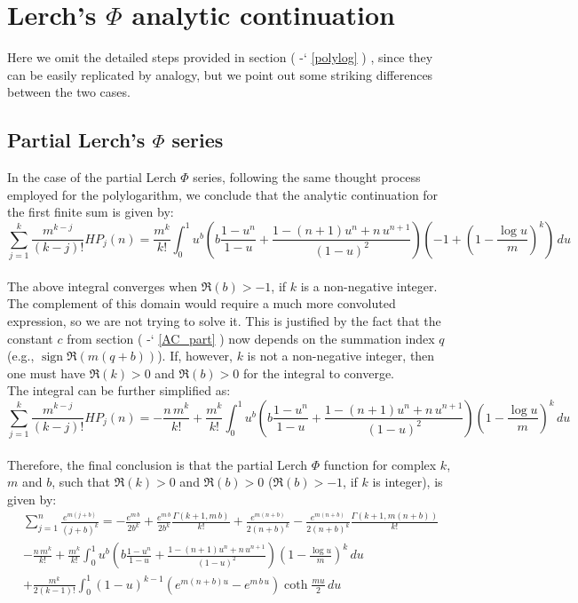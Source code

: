 \documentclass[12pt]{article}
\DeclareMathOperator{\sign}{sign}
\newcommand*{\secrefe}[1]{%
\begingroup
(\color{Aquamarine}
\romannumeral-`\x %
\setcitestyle{numbers}%
\ref{#1}%
\endgroup
)\ignorespacesafterend
}
\begin{document}
\section{Lerch's $\Phi$ analytic continuation}
Here we omit the detailed steps provided in section \secrefe{polylog}, since they can be easily replicated by analogy, but we point out some striking differences between the two cases.

\subsection{Partial Lerch's $\Phi$ series}
In the case of the partial Lerch $\Phi$ series, following the same thought process employed for the polylogarithm, we conclude that the analytic continuation for the first finite sum is given by:
\begin{equation} \label{eq:hp_soma} \nonumber
\sum_{j=1}^{k}\frac{m^{k-j}}{(k-j)!}HP_j(n)=\frac{m^k}{k!}\int_{0}^{1}u^b\left(b\frac{1-u^n}{1-u}+\frac{1-(n+1)u^n+n\,u^{n+1}}{(1-u)^2}\right)\left(-1+\left(1-\frac{\log{u}}{m}\right)^k\right)\,du
\end{equation}\\
\indent The above integral converges when $\Re{(b)}>-1$, if $k$ is a non-negative integer. The complement of this domain would require a much more convoluted expression, so we are not trying to solve it. This is justified by the fact that the constant $c$ from section \secrefe{AC_part} now depends on the summation index $q$ (e.g., $\sign{\Re{(m(q+b))}}$). If, however, $k$ is not a non-negative integer, then one must have $\Re{(k)}>0$ and $\Re{(b)}>0$ for the integral to converge.\\ 

The integral can be further simplified as:
\begin{equation} \nonumber
\sum_{j=1}^{k}\frac{m^{k-j}}{(k-j)!}HP_j(n)=-\frac{n\,m^k}{k!}+\frac{m^k}{k!}\int_{0}^{1}u^b\left(b\frac{1-u^n}{1-u}+\frac{1-(n+1)u^n+n\,u^{n+1}}{(1-u)^2}\right)\left(1-\frac{\log{u}}{m}\right)^k\,du
\end{equation}\\
\indent Therefore, the final conclusion is that the partial Lerch $\Phi$ function for complex $k$, $m$ and $b$, such that $\Re{(k)}>0$ and $\Re{(b)}>0$ ($\Re{(b)}>-1$, if $k$ is integer), is given by:
\begin{multline} \label{eq:partial_Lerch_AC}
\sum _{j=1}^{n}\frac{e^{m(j+b)}}{(j+b)^{k}}=-\frac{e^{m\,b}}{2b^{k}}+\frac{e^{m\,b}}{2b^k}\frac{\Gamma{(k+1,m\,b)}}{k!}+\frac{e^{m(n+b)}}{2(n+b)^{k}}-\frac{e^{m(n+b)}}{2(n+b)^k}\frac{\Gamma{\left(k+1,m(n+b)\right)}}{k!}\\-\frac{n\,m^k}{k!}+\frac{m^k}{k!}\int_{0}^{1}u^b\left(b\frac{1-u^n}{1-u}+\frac{1-(n+1)u^n+n\,u^{n+1}}{(1-u)^2}\right)\left(1-\frac{\log{u}}{m}\right)^k\,du\\+\frac{m^{k}}{2(k-1)!}\int_0^1(1-u)^{k-1}\left(e^{m(n+b) u}-e^{m\,b\,u}\right)\coth{\frac{m u}{2}}\,du \text{}
\end{multline}
\end{document}

